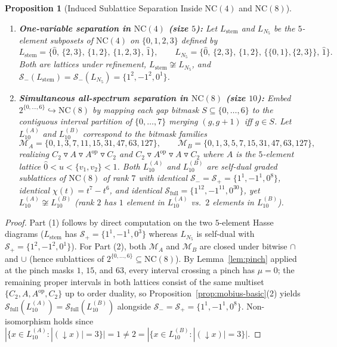 \documentclass[11pt]{article}
\newtheorem{proposition}[theorem]{Proposition}
\theoremstyle{definition}
\newcommand{\NC}{\mathrm{NC}}
\begin{document}
\begin{proposition}[Induced Sublattice Separation Inside $\NC(4)$ and $\NC(8)$]\label{prop:scope}
\leavevmode
\begin{enumerate}
  \item \textbf{One-variable separation in $\NC(4)$ (size $5$):} Let $L_{\mathrm{stem}}$ and $L_{N_5}$ be the $5$-element subposets of $\NC(4)$ on $\{0,1,2,3\}$ defined by
  \[
    L_{\mathrm{stem}} = \bigl\{\hat{0},\, \{2,3\},\, \{1,2\},\, \{1,2,3\},\, \hat{1}\bigr\}, \qquad
    L_{N_5} = \bigl\{\hat{0},\, \{2,3\},\, \{1,2\},\, \{\{0,1\},\{2,3\}\},\, \hat{1}\bigr\}.
  \]
  Both are lattices under refinement, $L_{\mathrm{stem}} \not\cong L_{N_5}$, and $\mathcal{S}_-(L_{\mathrm{stem}}) = \mathcal{S}_-(L_{N_5}) = \{1^2, -1^2, 0^1\}$.
  \item \textbf{Simultaneous all-spectrum separation in $\NC(8)$ (size $10$):} Embed $2^{\{0,\dots,6\}} \hookrightarrow \NC(8)$ by mapping each gap bitmask $S \subseteq \{0,\dots,6\}$ to the contiguous interval partition of $\{0,\dots,7\}$ merging $(g, g+1)$ iff $g \in S$. Let $L_{10}^{(A)}$ and $L_{10}^{(B)}$ correspond to the bitmask families
  \[
    \mathcal{M}_A = \{0, 1, 3, 7, 11, 15, 31, 47, 63, 127\}, \qquad
    \mathcal{M}_B = \{0, 1, 3, 5, 7, 15, 31, 47, 63, 127\},
  \]
  realizing $C_2 \triangledown A \triangledown A^{\mathrm{op}} \triangledown C_2$ and $C_2 \triangledown A^{\mathrm{op}} \triangledown A \triangledown C_2$ where $A$ is the $5$-element lattice $\hat{0} < u < \{v_1,v_2\} < \hat{1}$. Both $L_{10}^{(A)}$ and $L_{10}^{(B)}$ are self-dual graded sublattices of $\NC(8)$ of rank $7$ with identical $\mathcal{S}_- = \mathcal{S}_+ = \{1^1, -1^1, 0^8\}$, identical $\chi(t) = t^7 - t^6$, and identical $\mathcal{S}_{\mathrm{full}} = \{1^{12}, -1^{11}, 0^{30}\}$, yet $L_{10}^{(A)} \not\cong L_{10}^{(B)}$ (rank $2$ has $1$ element in $L_{10}^{(A)}$ vs.\ $2$ elements in $L_{10}^{(B)}$).
\end{enumerate}
\end{proposition}
\begin{proof}
Part (1) follows by direct computation on the two $5$-element Hasse diagrams ($L_{\mathrm{stem}}$ has $\mathcal{S}_+ = \{1^1, -1^1, 0^3\}$ whereas $L_{N_5}$ is self-dual with $\mathcal{S}_+ = \{1^2, -1^2, 0^1\}$). For Part (2), both $\mathcal{M}_A$ and $\mathcal{M}_B$ are closed under bitwise $\cap$ and $\cup$ (hence sublattices of $2^{\{0,\dots,6\}} \subseteq \NC(8)$). By Lemma~\ref{lem:pinch} applied at the pinch masks $1$, $15$, and $63$, every interval crossing a pinch has $\mu = 0$; the remaining proper intervals in both lattices consist of the same multiset $\{C_2, A, A^{\mathrm{op}}, C_2\}$ up to order duality, so Proposition~\ref{prop:mobius-basic}(2) yields $\mathcal{S}_{\mathrm{full}}(L_{10}^{(A)}) = \mathcal{S}_{\mathrm{full}}(L_{10}^{(B)})$ alongside $\mathcal{S}_- = \mathcal{S}_+ = \{1^1, -1^1, 0^8\}$. Non-isomorphism holds since $|\{x \in L_{10}^{(A)} : |(\downarrow x)| = 3\}| = 1 \ne 2 = |\{x \in L_{10}^{(B)} : |(\downarrow x)| = 3\}|$.
\end{proof}
\end{document}
